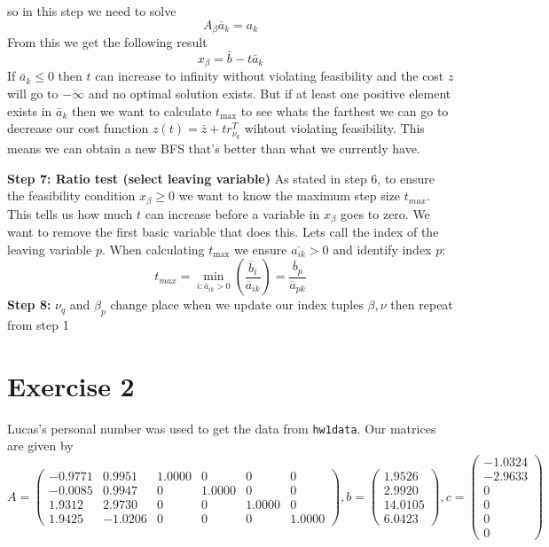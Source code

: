 \documentclass{assignment}
\def\code#1{\texttt{#1}}
\begin{document}
\begin{algorithmic}
        \State so in this step we need to solve $$A_{\beta}\overline{a}_k = a_k$$
        From this we get the following result 
        $$x_\beta = \bar{b} - t \bar{a}_k$$
        If $\bar{a}_k \leq 0$ then $t$ can increase to infinity without violating feasibility and the cost $z$ will go to $-\infty$ and no optimal solution exists. But if at least one positive element exists in $\bar{a}_k$ then
        we want to calculate $t_{\max}$ to see whats the farthest we can go to decrease our cost function $z(t) = \bar{z} + tr_{\nu_q}^T$ wihtout violating feasibility. This means we can obtain a new BFS that's better than what we currently have.
        
        \State \textbf{Step 7: Ratio test (select leaving variable)}
        \State As stated in step 6, to ensure the feasibility condition $x_\beta\ge 0$ we want to know the maximum step size $t_{max}$. This tells us how much $t$ can increase before
        a variable in $x_\beta$ goes to zero. We want to remove the first basic variable that does this. Lets call the index of the leaving variable $p$.
        When calculating $t_{\max}$ we ensure $\bar{a_{ik}} >0 $ 
        and identify index $p$:
        \[
            t_{max} = \min_{i: \overline{a}_{ik} > 0} \left( \frac{\overline{b}_i}{\overline{a}_{ik}} \right) = \frac{\overline{b}_p}{\overline{a}_{pk}}
        \]
        \State \textbf{Step 8:} $\nu_q$ and $\beta_p$ change place when we update our index tuples $\beta, \nu$ then repeat from step 1
        
    \EndIf
\end{algorithmic} 

\section*{Exercise 2}
Lucas's personal number was used to get the data from \code{hw1data}. Our matrices are given by 
$$A = \begin{pmatrix}
-0.9771 & 0.9951 & 1.0000 & 0 & 0 & 0 \\
-0.0085 & 0.9947 & 0 & 1.0000 & 0 & 0 \\
1.9312 & 2.9730 & 0 & 0 & 1.0000 & 0 \\
1.9425 & -1.0206 & 0 & 0 & 0 & 1.0000
\end{pmatrix}, b = \begin{pmatrix}
1.9526 \\
2.9920 \\
14.0105 \\
6.0423
\end{pmatrix}, c = \begin{pmatrix}
-1.0324 \\
-2.9633 \\
0 \\
0 \\
0 \\
0
\end{pmatrix}$$
\end{document}
